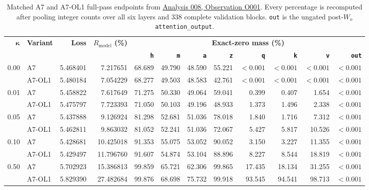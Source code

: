 \documentclass[10pt,a4paper]{article}
\newcommand{\Rmodel}{\ensuremath{R_{\mathrm{model}}}}
\newcommand{\code}[1]{\texttt{#1}}
\begin{document}
{\scriptsize
\begin{table}[htbp]
\centering
\caption{Matched A7 and A7-OL1 full-pass endpoints from \href{../../../analyses/008-2026-08-31-full-pass-frontier-with-a7/observations/O001-full-pass-frontier-with-a7.md}{Analysis 008, Observation O001}. Every percentage is recomputed after pooling integer counts over all six layers and 338 complete validation blocks. \code{out} is the ungated post-$W_o$ \code{attention\_output}.}
\label{tab:a7-a7-ol1-fullpass}
\setlength{\tabcolsep}{1.15pt}
\begin{tabular*}{\textwidth}{@{\extracolsep{\fill}}rl*{10}{r}@{}}
\toprule
$\boldsymbol{\kappa}$ & \textbf{Variant} & \textbf{Loss} & \textbf{\Rmodel{} (\%)} & \multicolumn{8}{c}{\textbf{Exact-zero mass (\%)}} \\
\cmidrule(l){5-12}
& & & & \textbf{\code{h}} & \textbf{\code{m}} & \textbf{\code{a}} & \textbf{\code{z}} & \textbf{\code{q}} & \textbf{\code{k}} & \textbf{\code{v}} & \textbf{\code{out}} \\
\midrule
\multirow{2}{*}{0.00} & A7     & 5.468401 & 7.217651  & 68.689 & 49.790 & 48.590 & 55.221 & $<0.001$ & $<0.001$ & $<0.001$ & $<0.001$ \\
                      & A7-OL1 & 5.480184 & 7.054229  & 68.277 & 49.503 & 48.583 & 42.761 & $<0.001$ & $<0.001$ & $<0.001$ & $<0.001$ \\
\hline
\multirow{2}{*}{0.01} & A7     & 5.458822 & 7.617649  & 71.275 & 50.330 & 49.064 & 59.041 & 0.399 & 0.407 & 1.654 & $<0.001$ \\
                      & A7-OL1 & 5.475797 & 7.723393  & 71.050 & 50.103 & 49.196 & 48.933 & 1.373 & 1.496 & 2.338 & $<0.001$ \\
\hline
\multirow{2}{*}{0.05} & A7     & 5.437888 & 9.126924  & 81.298 & 52.681 & 51.036 & 78.018 & 1.840 & 1.716 & 7.312 & $<0.001$ \\
                      & A7-OL1 & 5.462811 & 9.863032  & 81.052 & 52.241 & 51.036 & 72.067 & 5.427 & 5.817 & 10.526 & $<0.001$ \\
\hline
\multirow{2}{*}{0.10} & A7     & 5.428681 & 10.425018 & 91.353 & 55.075 & 53.052 & 90.052 & 3.150 & 3.227 & 11.355 & $<0.001$ \\
                      & A7-OL1 & 5.429497 & 11.796760 & 91.607 & 54.874 & 53.104 & 88.896 & 8.227 & 8.544 & 18.819 & $<0.001$ \\
\hline
\multirow{2}{*}{0.50} & A7     & 5.702923 & 15.386813 & 99.859 & 65.721 & 62.306 & 99.865 & 17.435 & 18.134 & 31.255 & $<0.001$ \\
                      & A7-OL1 & 5.829390 & 27.482684 & 99.876 & 68.698 & 75.732 & 99.918 & 93.545 & 94.541 & 98.713 & $<0.001$ \\
\bottomrule
\end{tabular*}
\end{table}}
\FloatBarrier
\end{document}
